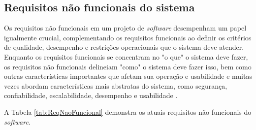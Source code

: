 \subsection{Requisitos não funcionais do sistema}

Os requisitos não funcionais em um projeto de \textit{software} desempenham um papel igualmente crucial, complementando os requisitos funcionais ao definir os critérios de qualidade, desempenho e restrições operacionais que o sistema deve atender. Enquanto os requisitos funcionais se concentram no "o que" o sistema deve fazer, os requisitos não funcionais delineiam "como" o sistema deve fazer isso, bem como outras características importantes que afetam sua operação e usabilidade e muitas vezes abordam características mais abstratas do sistema, como segurança, confiabilidade, escalabilidade, desempenho e usabilidade \cite{softwareengreq}. 
            
A Tabela \ref{tab:ReqNaoFuncional} demonstra os atuais requisitos não funcionais do \textit{software}.

